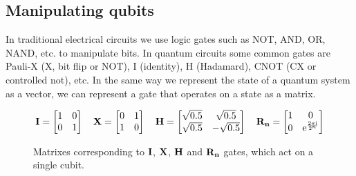 \subsection{Manipulating qubits}\label{sec:maniq}
\noindent
In traditional electrical circuits we use logic gates such as NOT, AND, OR, NAND, etc. to manipulate bits. In quantum circuits some common gates are Pauli-X (X, bit flip or NOT), I (identity), H (Hadamard), CNOT (CX or controlled not), etc. In the same way we represent the state of a quantum system as a vector, we can represent a gate that operates on a state as a matrix. 
\newcommand{\qi}{\begin{bmatrix}
        1 & 0\\
        0 & 1\\
    \end{bmatrix}}
\newcommand{\qre}[1]{\mathrm{e}^{\frac{2\pi \mathrm{i}}{2^{#1}}}}
\newcommand{\qr}[1]{\begin{bmatrix}
        1 & 0\\
        0 & \qre{#1}\\
    \end{bmatrix}}
\newcommand{\qx}{\begin{bmatrix}
        0 & 1\\
        1 & 0\\
    \end{bmatrix}}
\newcommand{\qh}{\begin{bmatrix}
        \sqrt{0.5} & \sqrt{0.5}\\
        \sqrt{0.5} & -\sqrt{0.5}\\
    \end{bmatrix}}
\newcommand{\qcx}{\begin{bmatrix}
        1 & 0 & 0 & 0\\
        0 & 1 & 0 & 0\\
        0 & 0 & 0 & 1\\
        0 & 0 & 1 & 0\\
    \end{bmatrix}}
    

\begin{figure}[H]
    \centering
    \begin{align*}
        \qti = \qi\quad
        \qtx = \qx\quad
        \qth = \qh\quad
        \qtr{n} = \qr{n}
    \end{align*}
    \caption{Matrixes corresponding to $\mathbf{I}$, $\mathbf{X}$, $\mathbf{H}$ and $\mathbf{R_{n}}$ gates, which act on a single cubit.}
    \label{fig:single_qubit_gates}
\end{figure}

